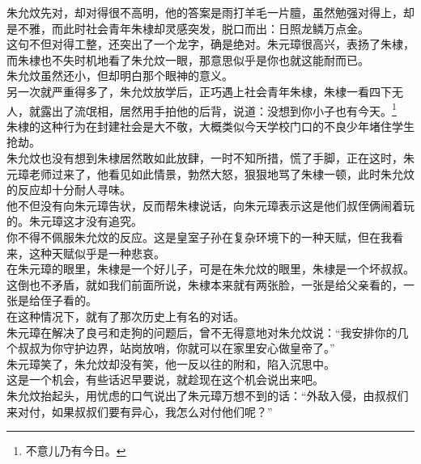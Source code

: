 \begin{multicols}{\theparacolNo}
朱允炆先对，却对得很不高明，他的答案是雨打羊毛一片膻，虽然勉强对得上，却是不雅，而此时社会青年朱棣却灵感突发，脱口而出：日照龙鳞万点金。\\

这句不但对得工整，还突出了一个龙字，确是绝对。朱元璋很高兴，表扬了朱棣，而朱棣也不失时机地看了朱允炆一眼，那意思似乎是你也就这能耐而已。\\

朱允炆虽然还小，但却明白那个眼神的意义。\\

另一次就严重得多了，朱允炆放学后，正巧遇上社会青年朱棣，朱棣一看四下无人，就露出了流氓相，居然用手拍他的后背，说道：没想到你小子也有今天。\footnote{不意儿乃有今日。}\\

朱棣的这种行为在封建社会是大不敬，大概类似今天学校门口的不良少年堵住学生抢劫。\\

朱允炆也没有想到朱棣居然敢如此放肆，一时不知所措，慌了手脚，正在这时，朱元璋老师过来了，他看见如此情景，勃然大怒，狠狠地骂了朱棣一顿，此时朱允炆的反应却十分耐人寻味。\\

他不但没有向朱元璋告状，反而帮朱棣说话，向朱元璋表示这是他们叔侄俩闹着玩的。朱元璋这才没有追究。\\

你不得不佩服朱允炆的反应。这是皇室子孙在复杂环境下的一种天赋，但在我看来，这种天赋似乎是一种悲哀。\\

在朱元璋的眼里，朱棣是一个好儿子，可是在朱允炆的眼里，朱棣是一个坏叔叔。这倒也不矛盾，就如我们前面所说，朱棣本来就有两张脸，一张是给父亲看的，一张是给侄子看的。\\

在这种情况下，就有了那次历史上有名的对话。\\

朱元璋在解决了良弓和走狗的问题后，曾不无得意地对朱允炆说：“我安排你的几个叔叔为你守护边界，站岗放哨，你就可以在家里安心做皇帝了。”\\

朱元璋笑了，朱允炆却没有笑，他一反以往的附和，陷入沉思中。\\

这是一个机会，有些话迟早要说，就趁现在这个机会说出来吧。\\

朱允炆抬起头，用忧虑的口气说出了朱元璋万想不到的话：“外敌入侵，由叔叔们来对付，如果叔叔们要有异心，我怎么对付他们呢？”\\


\end{multicols}
